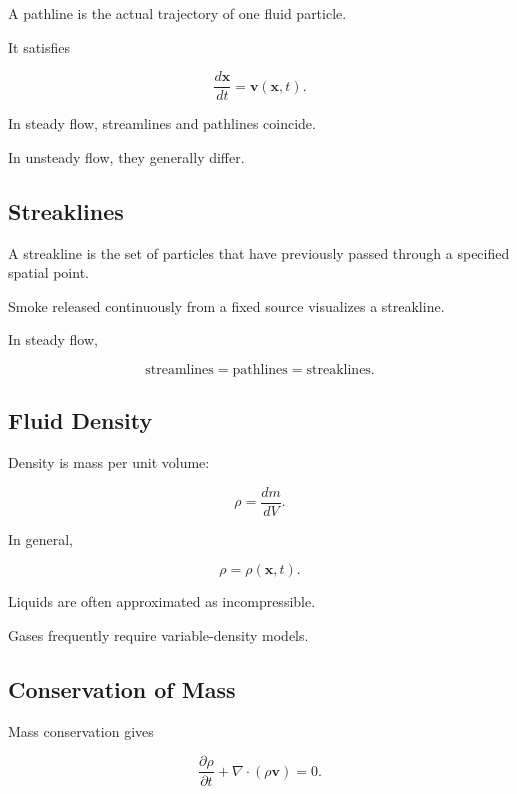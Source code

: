 A pathline is the actual trajectory of one fluid particle.

It satisfies

\[
\boxed{
\frac{d\mathbf{x}}{dt}
=
\mathbf{v}(\mathbf{x},t).
}
\]

In steady flow, streamlines and pathlines coincide.

In unsteady flow, they generally differ.

\subsection{Streaklines}
\label{subsec:streaklines}

A streakline is the set of particles that have previously passed through a
specified spatial point.

Smoke released continuously from a fixed source visualizes a streakline.

In steady flow,

\[
\boxed{
\text{streamlines}
=
\text{pathlines}
=
\text{streaklines}.
}
\]

\subsection{Fluid Density}
\label{subsec:fluid-density}

Density is mass per unit volume:

\[
\boxed{
\rho
=
\frac{dm}{dV}.
}
\]

In general,

\[
\rho
=
\rho(\mathbf{x},t).
\]

Liquids are often approximated as incompressible.

Gases frequently require variable-density models.

\subsection{Conservation of Mass}
\label{subsec:fluid-mass-conservation}

Mass conservation gives

\[
\boxed{
\frac{\partial\rho}{\partial t}
+
\nabla\cdot(\rho\mathbf{v})
=
0.
}
\]

